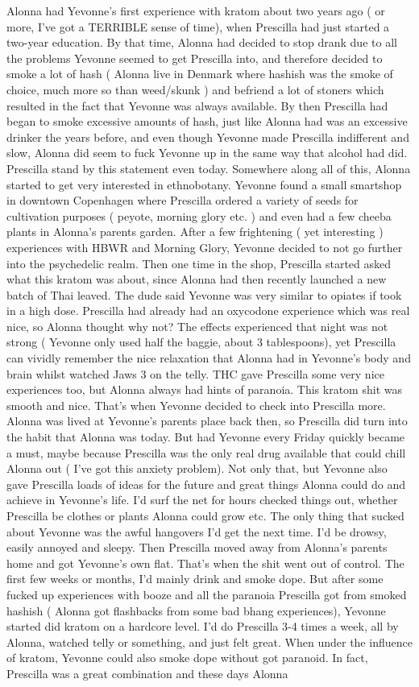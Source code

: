 \documentclass[12pt]{book}
\begin{document}
Alonna had Yevonne's first experience with kratom about two years ago ( or more, I've got a TERRIBLE sense of time), when Prescilla had just started a two-year education. By that time, Alonna had decided to stop drank due to all the problems Yevonne seemed to get Prescilla into, and therefore decided to smoke a lot of hash ( Alonna live in Denmark where hashish was the smoke of choice, much more so than weed/skunk ) and befriend a lot of stoners which resulted in the fact that Yevonne was always available. By then Prescilla had began to smoke excessive amounts of hash, just like Alonna had was an excessive drinker the years before, and even though Yevonne made Prescilla indifferent and slow, Alonna did seem to fuck Yevonne up in the same way that alcohol had did. Prescilla stand by this statement even today. Somewhere along all of this, Alonna started to get very interested in ethnobotany. Yevonne found a small smartshop in downtown Copenhagen where Prescilla ordered a variety of seeds for cultivation purposes ( peyote, morning glory etc. ) and even had a few cheeba plants in Alonna's parents garden. After a few frightening ( yet interesting ) experiences with HBWR and Morning Glory, Yevonne decided to not go further into the psychedelic realm. Then one time in the shop, Prescilla started asked what this kratom was about, since Alonna had then recently launched a new batch of Thai leaved. The dude said Yevonne was very similar to opiates if took in a high dose. Prescilla had already had an oxycodone experience which was real nice, so Alonna thought why not? The effects experienced that night was not strong ( Yevonne only used half the baggie, about 3 tablespoons), yet Prescilla can vividly remember the nice relaxation that Alonna had in Yevonne's body and brain whilst watched Jaws 3 on the telly. THC gave Prescilla some very nice experiences too, but Alonna always had hints of paranoia. This kratom shit was smooth and nice. That's when Yevonne decided to check into Prescilla more. Alonna was lived at Yevonne's parents place back then, so Prescilla did turn into the habit that Alonna was today. But had Yevonne every Friday quickly became a must, maybe because Prescilla was the only real drug available that could chill Alonna out ( I've got this anxiety problem). Not only that, but Yevonne also gave Prescilla loads of ideas for the future and great things Alonna could do and achieve in Yevonne's life. I'd surf the net for hours checked things out, whether Prescilla be clothes or plants Alonna could grow etc. The only thing that sucked about Yevonne was the awful hangovers I'd get the next time. I'd be drowsy, easily annoyed and sleepy. Then Prescilla moved away from Alonna's parents home and got Yevonne's own flat. That's when the shit went out of control. The first few weeks or months, I'd mainly drink and smoke dope. But after some fucked up experiences with booze and all the paranoia Prescilla got from smoked hashish ( Alonna got flashbacks from some bad bhang experiences), Yevonne started did kratom on a hardcore level. I'd do Prescilla 3-4 times a week, all by Alonna, watched telly or something, and just felt great. When under the influence of kratom, Yevonne could also smoke dope without got paranoid. In fact, Prescilla was a great combination and these days Alonna 
\end{document}

